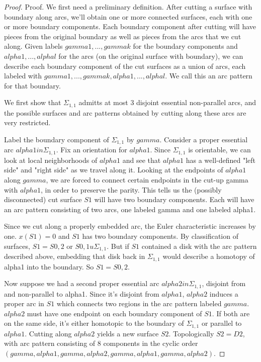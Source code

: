 \documentclass[12pt]{amsart}
\theoremstyle{definition}
\newcommand{\Si}{\Sigma}
\begin{document}
\begin{proof}

Proof. We first need a preliminary definition. After cutting a surface with
boundary along arcs, we'll obtain one or more connected surfaces, each with one
or more boundary components. Each boundary component after cutting will have
pieces from the original boundary as well as pieces from the arcs that we cut
along. Given labels $gamma1,...,gammak$ for the boundary components and
$alpha1,...,alphal$ for the arcs (on the original surface with boundary), we can
describe each boundary component of the cut surfaces as a union of arcs, each
labeled with $gamma1,...,gammak,alpha1,...,alphal$. We call this an arc pattern
for that boundary.

We first show that $\Si_{1,1}$ admitts at most 3 disjoint essential non-parallel arcs,
and the possible surfaces and arc patterns obtained by cutting along these arcs
are very restricted.

Label the boundary component of $\Si_{1,1}$ by $gamma$. Consider a proper essential arc
$alpha1 in \Si_{1,1}$. Fix an orientation for $alpha1$. Since $\Si_{1,1}$ is orientable, we can
look at local neighborhoods of $alpha1$ and see that $alpha1$ has a well-defined
"left side" and "right side" as we travel along it. Looking at the endpoints of
$alpha1$ along $gamma$, we are forced to connect certain endpoints in the cut-up
gamma with $alpha1$, in order to preserve the parity. This tells us the (possibly
disconnected) cut surface $S1$ will have two boundary components. Each will have
an arc pattern consisting of two arcs, one labeled gamma and one labeled
alpha1.

Since we cut along a properly embedded arc, the Euler characteristic increases
by one. $x(S1)=0$ and $S1$ has two boundary components. By classification of
surfaces, $S1 = S0,2$ or $S0,1 u \Si_{1,1}$. But if $S1$ contained a disk with the arc
pattern described above, embedding that disk back in $\Si_{1,1}$ would describe
a homotopy of alpha1 into the boundary. So $S1 = S0,2$.

Now suppose we had a second proper essential arc $alpha2 in \Si_{1,1}$, disjoint from
and non-parallel to alpha1. Since it's disjoint from $alpha1$, $alpha2$ induces
a proper arc in $S1$ which connects two regions in the arc pattern labeled
$gamma$.
$alpha2$ must have one endpoint on each boundary component of $S1$. If both are on
the same side, it's either homotopic to the boundary of $\Si_{1,1}$ or parallel to
$alpha1$. Cutting along $alpha2$ yields a new surface $S2$. Topologically
$S2=D2$, with
arc pattern consisting of 8 components in the cyclic order
$(gamma,alpha1,gamma,alpha2,gamma,alpha1,gamma,alpha2)$.


\end{proof}
\end{document}
